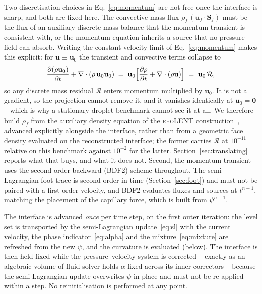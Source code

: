 \documentclass[preprint,3p,11pt]{elsarticle}
\newcommand{\psilev}{\psi}                       %
\newcommand{\uvec}{\mathbf{u}}
\begin{document}
Two discretisation choices in Eq.~\eqref{eq:momentum} are not free once the interface is
sharp, and both are fixed here. The convective mass flux $\rho_f\,(\uvec_f\!\cdot\mathbf S_f)$
must be the flux of an auxiliary discrete mass balance that the momentum transient is
consistent with, or the momentum equation inherits a source that no pressure field can
absorb. Writing the constant-velocity limit of Eq.~\eqref{eq:momentum} makes this explicit:
for $\uvec\equiv\uvec_0$ the transient and convective terms collapse to
\begin{equation}
  \frac{\partial(\rho\uvec_0)}{\partial t} + \nabla\cdot(\rho\,\uvec_0\uvec_0)
  \;=\; \uvec_0\Bigl[\frac{\partial\rho}{\partial t} + \nabla\cdot(\rho\uvec)\Bigr]
  \;=\; \uvec_0\,\mathcal R ,
  \label{eq:massmomentum}
\end{equation}
so any discrete mass residual $\mathcal R$ enters momentum multiplied by $\uvec_0$. It is
not a gradient, so the projection cannot remove it, and it vanishes identically at
$\uvec_0=\mathbf 0$ -- which is why a stationary-droplet benchmark cannot see it at all. We
therefore build $\rho_f$ from the auxiliary density equation of the \textsc{rhoLENT}
construction~\cite{liu2023}, advanced explicitly alongside the interface, rather than from
a geometric face density evaluated on the reconstructed interface; the former carries
$\mathcal R$ at $10^{-11}$ relative on this benchmark against $10^{-2}$ for the latter.
Section~\ref{sec:translating} reports what that buys, and what it does not.
Second, the momentum transient uses the second-order backward (BDF2) scheme throughout. The
semi-Lagrangian foot trace is second order in time (Section~\ref{sec:foot}) and must not be
paired with a first-order velocity, and BDF2 evaluates fluxes and sources at $t^{n+1}$,
matching the placement of the capillary force, which is built from $\psilev^{n+1}$.

The interface is advanced \emph{once} per time step, on the first outer iteration: the
level set is transported by the semi-Lagrangian update~\eqref{eq:sl} with the current
velocity, the phase indicator~\eqref{eq:alpha} and the mixture~\eqref{eq:mixture} are
refreshed from the new $\psilev$, and the curvature is evaluated (below). The interface is
then held fixed while the pressure--velocity system is corrected -- exactly as an algebraic
volume-of-fluid solver holds $\alpha$ fixed across its inner correctors -- because the
semi-Lagrangian update overwrites $\psilev$ in place and must not be re-applied within a
step. No reinitialisation is performed at any point.
\end{document}
